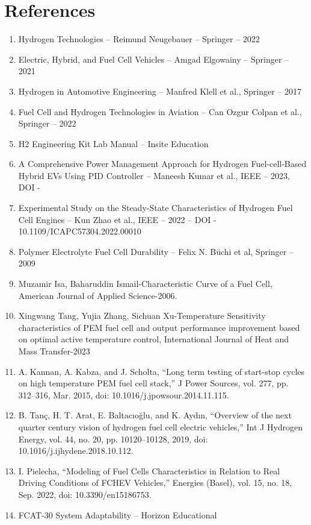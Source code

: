 \documentclass[
	a4paper, %
	10pt, %
]{LTJournalArticle}
\begin{document}
\section{References}
\begin{enumerate}
	\item Hydrogen Technologies – Reimund Neugebauer – Springer – 2022 
	\item Electric, Hybrid, and Fuel Cell Vehicles – Amgad Elgowainy – Springer – 2021
    \item Hydrogen in Automotive Engineering – Manfred Klell et al., Springer – 2017
    \item Fuel Cell and Hydrogen Technologies in Aviation – Can Ozgur Colpan et al., Springer – 2022
    \item H2 Engineering Kit Lab Manual – Insite Education
    \item A Comprehensive Power Management Approach for Hydrogen Fuel-cell-Based Hybrid EVs Using PID Controller – Maneesh Kumar et al., IEEE – 2023, DOI - 
    \item Experimental Study on the Steady-State Characteristics of Hydrogen Fuel Cell Engines – Kun Zhao et al., IEEE – 2022 – DOI - 10.1109/ICAPC57304.2022.00010
    \item Polymer Electrolyte Fuel Cell Durability – Felix N. Büchi et al, Springer – 2009 
    \item Muzamir Isa, Baharuddin Ismail-Characteristic Curve of a Fuel Cell, American Journal of Applied Science-2006.
    \item Xingwang Tang, Yujia Zhang, Sichuan Xu-Temperature Sensitivity characteristics of PEM fuel cell and output performance improvement based on optimal active temperature control, International Journal of Heat and Mass Transfer-2023
    \item A. Kannan, A. Kabza, and J. Scholta, “Long term testing of start-stop cycles on high temperature PEM fuel cell stack,” J Power Sources, vol. 277, pp. 312–316, Mar. 2015, doi: 10.1016/j.jpowsour.2014.11.115.
    \item B. Tanç, H. T. Arat, E. Baltacıoğlu, and K. Aydın, “Overview of the next quarter century vision of hydrogen fuel cell electric vehicles,” Int J Hydrogen Energy, vol. 44, no. 20, pp. 10120–10128, 2019, doi: 10.1016/j.ijhydene.2018.10.112.
    \item I. Pielecha, “Modeling of Fuel Cells Characteristics in Relation to Real Driving Conditions of FCHEV Vehicles,” Energies (Basel), vol. 15, no. 18, Sep. 2022, doi: 10.3390/en15186753.
    \item FCAT-30 System Adaptability – Horizon Educational 

\end{enumerate}
\end{document}
